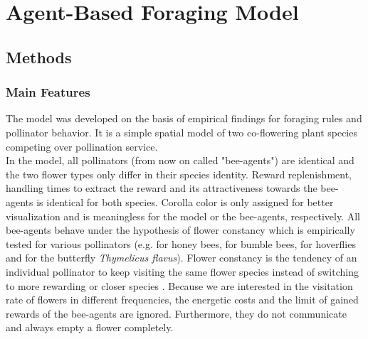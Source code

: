 
\newpage
\section{Agent-Based Foraging Model}

\subsection{Methods}

\subsubsection*{Main Features} %
The model was developed on the basis of empirical findings for foraging rules and pollinator behavior.  It is a simple spatial model of two co-flowering plant species competing over pollination service. \\
In the model, all pollinators (from now on called "bee-agents") are identical and the two flower types only differ in their species identity. Reward replenishment, handling times to extract the reward and its attractiveness towards the bee-agents is identical for both species. Corolla color is only assigned for better visualization and is meaningless for the model or the bee-agents, respectively. All bee-agents behave under the hypothesis of flower constancy which is empirically tested for various pollinators (e.g. \citet{hill1997spontaneous} for honey bees, \citet{chittka1997foraging} for bumble bees, \citet{goulson1998flower} for hoverflies and \citet{goulson1997foraging} for the butterfly \textit{Thymelicus flavus}). Flower constancy is the tendency of an individual pollinator to keep visiting the same flower species instead of switching to more rewarding or closer species \citep{chittka1999flower,waser1986flower}. Because we are interested in the visitation rate of flowers in different frequencies, the energetic costs and the limit of gained rewards of the bee-agents are ignored. Furthermore, they do not communicate and always empty a flower completely. 

